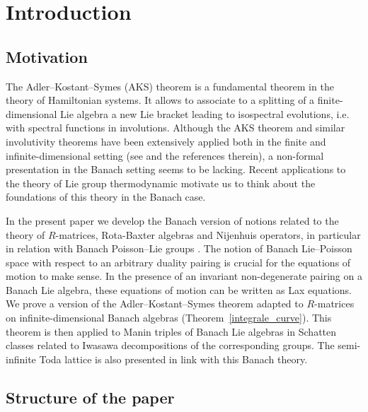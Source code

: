 \documentclass[a4paper,12pt,reqno]{amsart}%
\theoremstyle{definition}
\theoremstyle{remark}
\numberwithin{theorem}{section}
\numberwithin{equation}{section}
\newcommand{\1}{{\bf 1}}
\begin{document}
\maketitle

\tableofcontents

\section{Introduction}

\subsection{Motivation}

The Adler--Kostant--Symes (AKS) theorem is a fundamental theorem in the theory of Hamiltonian systems. It allows to associate to a splitting of a finite-dimensional Lie algebra a new Lie bracket leading to isospectral evolutions,  i.e. with spectral functions in involutions. Although the AKS theorem and similar involutivity theorems have been extensively applied both in the finite and  infinite-dimensional setting (see \cite{adler78,symes80int,symes80,ratiu80involution,morrison2013,pelletier24} and the references therein), a non-formal presentation in the Banach setting seems to be lacking. Recent applications to the theory of Lie group thermodynamic \cite{Barbaresco_AKS} motivate us to think about the foundations of this theory in the Banach case.

In the present paper we develop the  Banach version of notions related to the theory of $R$-matrices, Rota-Baxter algebras and Nijenhuis operators, in particular in relation with Banach Poisson--Lie groups \cite{tumpach-bruhat,GT-u-bial}. The notion of Banach Lie--Poisson space with respect to an arbitrary duality pairing  is crucial for the equations of motion to make sense. In the presence of an invariant non-degenerate pairing on a Banach Lie algebra, these equations of motion can be written as Lax equations.  We prove a version of the Adler--Kostant--Symes theorem adapted to $R$-matrices on infinite-dimensional Banach algebras (Theorem~\ref{integrale_curve}). This theorem is then applied to Manin triples of Banach Lie algebras in Schatten classes related to Iwasawa decompositions of the corresponding groups. 
The semi-infinite Toda lattice is also presented in link with this Banach theory.


\subsection{Structure of the paper}
\end{document}
